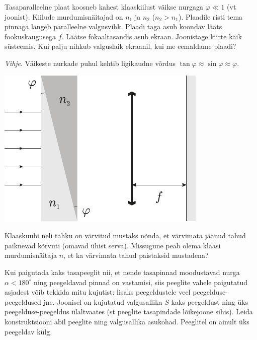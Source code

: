 \documentclass[10pt]{article}
\begin{document}
{%

Tasaparalleelne plaat koosneb kahest klaaskiilust väikse nurgaga $\varphi \ll 1$ (vt joonist). Kiilude murdumisnäitajad on $n_1$ ja $n_2$ ($n_2 > n_1$). Plaadile risti tema pinnaga langeb paralleelne valgusvihk. Plaadi taga asub koondav lääts fookuskaugusega $f$. Läätse fokaaltasandis asub ekraan. Joonistage kiirte käik süsteemis. Kui palju nihkub valguslaik ekraanil, kui me eemaldame plaadi? 

\emph{Vihje}. Väikeste nurkade puhul kehtib ligikaudne võrdus $\tan \varphi \approx \sin \varphi \approx \varphi $.

\begin{center}
	\includegraphics[width=0.6\linewidth]{2006-lahg-06-yl}
\end{center}
\probend
\bigskip


Klaaskuubi neli tahku on värvitud mustaks nõnda,
et värvimata jäänud tahud paiknevad kõrvuti (omavad ühist serva). Missugune peab olema klaasi murdumisnäitaja $n$, et ka värvimata tahud
paistaksid mustadena?
\probend
\bigskip


Kui paigutada kaks tasapeeglit nii, et nende tasapinnad moodustavad nurga $\alpha<180^\circ$ ning peegeldavad pinnad on vastamisi, siis peeglite vahele paigutatud asjadest võib tekkida mitu kujutist: lisaks peegeldustele veel peegelduse-peegeldused jne. Joonisel on kujutatud valgusallika $S$ kaks peegeldust ning üks peegelduse-peegeldus ülaltvaates (st peeglite tasapindade lõikejoone sihis). Leida konstruktsiooni abil peeglite ning valgusallika asukohad. Peeglitel on ainult üks peegeldav külg.\\

}
\end{document}
